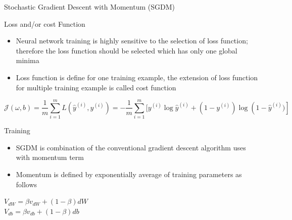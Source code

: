 \documentclass[10pt]{beamer}
\begin{document}
\begin{frame}{Stochastic Gradient Descent with Momentum (SGDM)}
    \begin{block}{Loss and/or cost Function}
        \begin{itemize}
            \item Neural network training is highly sensitive to the selection of loss function; therefore the loss function should be selected which has only one global minima
            \item Loss function is define for one training example, the extension of loss function for multiple training example is called cost function 
        \end{itemize}
            \vspace{1pt}
            \centering
            $$\mathcal{J}(\omega, b)=\frac{1}{m} \sum_{i=1}^{m} L\left(\hat{y}^{(i)}, y^{(i)}\right)=-\frac{1}{m} \sum_{i=1}^{m} [y^{(i)} \log \hat{y}^{(i)}+\left(1-y^{(i)}\right) \log \left(1 - \hat{y}^{(i)})\right]$$ 
    \end{block}
    
    \begin{block}{Training}
         \begin{itemize}
             \item SGDM is combination of the conventional gradient descent algorithm uses with momentum term 
             \item Momentum is defined by exponentially average of training parameters as follows
         \end{itemize}
            \centering
            $V_{d W}=\beta v_{d W}+(1-\beta) d W$ \\
            $V_{d b}=\beta v_{d b}+(1-\beta) d b$
    \end{block}
\end{frame}
\end{document}
